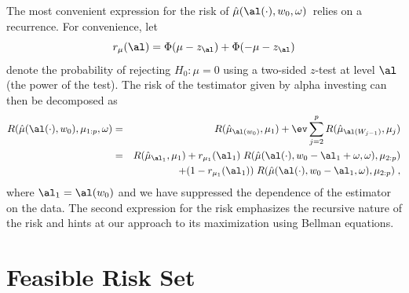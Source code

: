 \documentclass[12pt]{article}
\newcommand{\test}{\mbox{$\hat\mu(\al(\cdot),w_0,\omega)$}}
\begin{document}
 The most convenient expression for the risk of \test\ relies on a recurrence.
  For convenience, let
 \begin{equation}
   r_\mu(\al) = \Phi(\mu-z_\al)+\Phi(-\mu-z_\al)   
 \label{eq:rMu}
 \end{equation}
 denote the probability of rejecting $H_0: \mu=0$ using a two-sided $z$-test at
 level $\al$ (the power of the test).  The risk of the testimator given by alpha
 investing can then be decomposed as
 \begin{eqnarray}
   R(\hat\mu(\al(\cdot),w_0),\mu_{1:p}, \omega) 
    &=& R(\hat\mu_{\al(w_0)},\mu_1)
           + \ev \sum_{j=2}^p R(\hat\mu_{\al(W_{j-1})},\mu_j)  \cr
    &=& R(\hat\mu_{\al_1},\mu_1)
           + r_{\mu_1}(\al_1)\; 
               R(\hat\mu(\al(\cdot),w_0-\al_1+\omega,\omega),\mu_{2:p})\cr
    & & \qquad + (1-r_{\mu_1}(\al_1))\; 
               R(\hat\mu(\al(\cdot),w_0-\al_1,\omega),\mu_{2:p}) \;,
 \label{eq:riskTestAI}
 \end{eqnarray}
 where $\al_1 = \al(w_0)$ and we have suppressed the dependence of the estimator
 on the data.  The second expression for the risk emphasizes the recursive
 nature of the risk and hints at our approach to its maximization using Bellman
 equations.


\section{ Feasible Risk Set }
\end{document}
